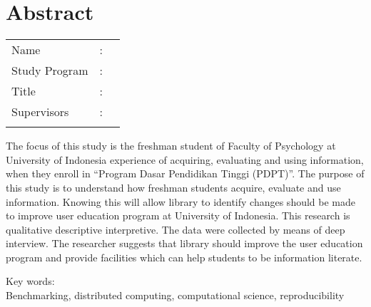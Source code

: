 %
%
%

\chapter*{Abstract}

\vspace*{0.2cm}
{
	\setlength{\parindent}{0pt}

	\begin{tabular}{@{}l l p{10cm}}
		Name&: & \penulis \\
		Study Program&: & \program \\
		Title&: & \judulInggris \\
		Supervisors&: & \pembimbing \\
				   &  & \pembimbingDua \\
	\end{tabular}

	\bigskip
	\bigskip

	The focus of this study is the freshman student of Faculty of Psychology at University of
	Indonesia experience of acquiring, evaluating and using information, when they enroll in
	“Program Dasar Pendidikan Tinggi (PDPT)”. The purpose of this study is to understand
	how freshman students acquire, evaluate and use information. Knowing this will allow
	library to identify changes should be made to improve user education program at
	University of Indonesia. This research is qualitative descriptive interpretive. The data
	were collected by means of deep interview. The researcher suggests that library should
	improve the user education program and provide facilities which can help students to be
	information literate.

	\bigskip

	Key words:\\
	Benchmarking, distributed computing, computational science, reproducibility
}

\newpage